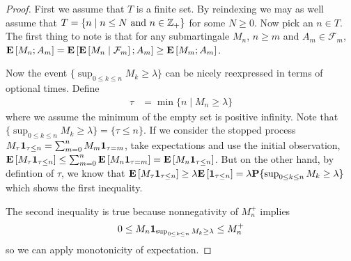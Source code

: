 \begin{proof}
First we assume that $T$ is a finite set.  By reindexing we may as
well assume that $T = \lbrace n \mid n \leq N \text{ and } n \in
\integers_+ \rbrace$ for some $N \geq 0$.  Now pick an $n \in T$.
The first thing to note is that for any submartingale $M_n$, $n\geq m$ and $A_m
\in \mathcal{F}_m$, $\expectation{M_n ; A_m} =
\expectation{\cexpectationlong{\mathcal{F}_m}{M_n} ; A_m}
\geq \expectation{M_m ; A_m}$.

Now the event $\lbrace \sup_{0 \leq k \leq n} M_k \geq \lambda
\rbrace$ can be nicely reexpressed in terms of optional times.  Define
\begin{align*}
\tau &= \min \lbrace  n \mid M_n \geq \lambda \rbrace
\end{align*}
where we assume the minimum of the empty set is positive infinity. 
Note that $\lbrace \sup_{0 \leq k \leq n} M_k \geq \lambda
\rbrace = \lbrace \tau \leq n \rbrace$.  If we consider the stopped
process $M_\tau \characteristic{\tau \leq n} = \sum_{m=0}^n M_m
\characteristic{\tau = m}$, take expectations and use the initial
observation,
$\expectation{M_\tau \characteristic{\tau \leq n}} \leq \sum_{m=0}^n
\expectation{M_n \characteristic{\tau = m}} = \expectation {M_n
  \characteristic{\tau \leq n}}$.  But on the other hand, by defintion
of $\tau$, we know that $\expectation{M_\tau \characteristic{\tau \leq
    n}} \geq \lambda \expectation{\characteristic{\tau \leq n}} =
\lambda \probability{\sup_{0 \leq k \leq n} M_k \geq \lambda}$ which
shows the first inequality.

The second inequality is true because nonnegativity of $M_n^+$ implies 
\begin{align*}
0 \leq M_n
\characteristic{\sup_{0 \leq k \leq n} M_k \geq \lambda} \leq M_n^+
\end{align*} so we can apply
monotonicity of expectation.


\end{proof}
